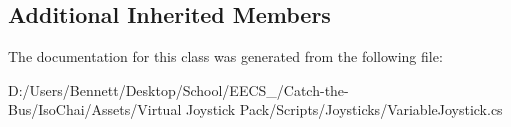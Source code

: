 \subsection*{Additional Inherited Members}


The documentation for this class was generated from the following file\+:\begin{DoxyCompactItemize}
\item 
D\+:/\+Users/\+Bennett/\+Desktop/\+School/\+E\+E\+C\+S\+\_/\+Catch-\/the-\/\+Bus/\+Iso\+Chai/\+Assets/\+Virtual Joystick Pack/\+Scripts/\+Joysticks/Variable\+Joystick.\+cs\end{DoxyCompactItemize}
